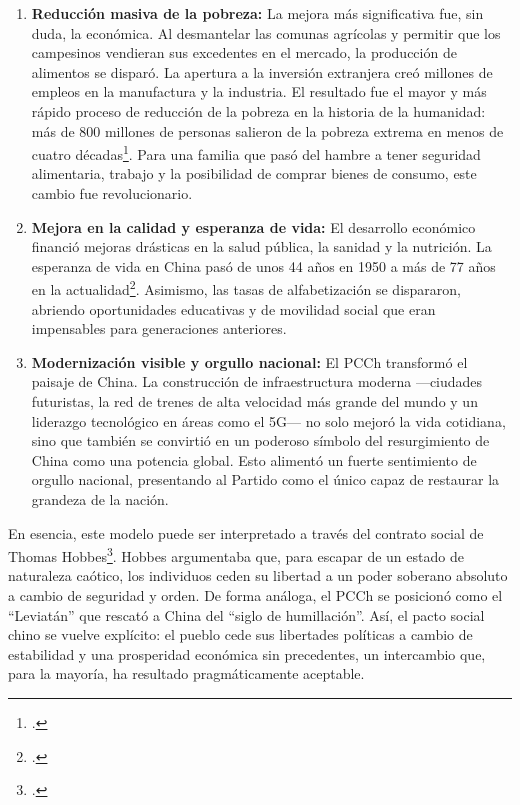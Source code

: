 \documentclass[12pt, letterpaper]{article}
\begin{document}
\begin{enumerate}[label=\arabic*., itemsep=1em, leftmargin=*]
	\item \textbf{Reducción masiva de la pobreza:} La mejora más significativa fue, sin duda, la económica. Al desmantelar las comunas agrícolas y permitir que los campesinos vendieran sus excedentes en el mercado, la producción de alimentos se disparó. La apertura a la inversión extranjera creó millones de empleos en la manufactura y la industria. El resultado fue el mayor y más rápido proceso de reducción de la pobreza en la historia de la humanidad: más de 800 millones de personas salieron de la pobreza extrema en menos de cuatro décadas\footcite{banco_mundial_2022}. Para una familia que pasó del hambre a tener seguridad alimentaria, trabajo y la posibilidad de comprar bienes de consumo, este cambio fue revolucionario.

	\item \textbf{Mejora en la calidad y esperanza de vida:} El desarrollo económico financió mejoras drásticas en la salud pública, la sanidad y la nutrición. La esperanza de vida en China pasó de unos 44 años en 1950 a más de 77 años en la actualidad\footcite{banco_mundial_sf_china}. Asimismo, las tasas de alfabetización se dispararon, abriendo oportunidades educativas y de movilidad social que eran impensables para generaciones anteriores.

	\item \textbf{Modernización visible y orgullo nacional:} El PCCh transformó el paisaje de China. La construcción de infraestructura moderna —ciudades futuristas, la red de trenes de alta velocidad más grande del mundo y un liderazgo tecnológico en áreas como el 5G— no solo mejoró la vida cotidiana, sino que también se convirtió en un poderoso símbolo del resurgimiento de China como una potencia global. Esto alimentó un fuerte sentimiento de orgullo nacional, presentando al Partido como el único capaz de restaurar la grandeza de la nación.
\end{enumerate}

En esencia, este modelo puede ser interpretado a través del contrato social de Thomas Hobbes\footcite{hobbes_1651}. Hobbes argumentaba que, para escapar de un estado de naturaleza caótico, los individuos ceden su libertad a un poder soberano absoluto a cambio de seguridad y orden. De forma análoga, el PCCh se posicionó como el ``Leviatán'' que rescató a China del ``siglo de humillación''. Así, el pacto social chino se vuelve explícito: el pueblo cede sus libertades políticas a cambio de estabilidad y una prosperidad económica sin precedentes, un intercambio que, para la mayoría, ha resultado pragmáticamente aceptable.
\end{document}
